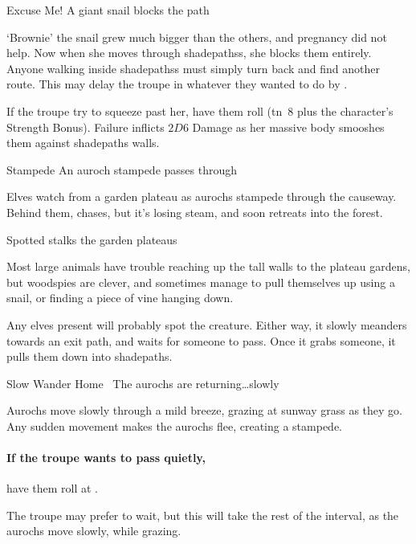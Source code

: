 
{Excuse Me!}%
{A giant snail blocks the path}%

`Brownie' the snail grew much bigger than the others, and pregnancy did not help.
Now when she moves through \glspl{shadepaths}, she blocks them entirely.
Anyone walking inside \glspl{shadepaths} must simply turn back and find another route.
This may delay the troupe in whatever they wanted to do by .

If the troupe try to squeeze past her, have them roll  (\gls{tn}~8 plus the character's Strength Bonus).
Failure inflicts $2D6$ Damage as her massive body smooshes them against \gls{shadepaths} walls.

{Stampede}%
{An auroch stampede passes through}%

Elves watch from a garden plateau as aurochs stampede through the causeway.
Behind them,  chases, but it's losing steam, and soon retreats into the forest.

{ Spotted}%
{ stalks the garden plateaus}%

Most large animals have trouble reaching up the tall walls to the plateau gardens, but woodspies are clever, and sometimes manage to pull themselves up using a snail, or finding a piece of vine hanging down.

Any elves present will probably spot the creature.
Either way, it slowly meanders towards an exit path, and waits for someone to pass.
Once it grabs someone, it pulls them down into \gls{shadepaths}.

{Slow Wander Home}%
{~The aurochs are returning\ldots slowly}%

Aurochs move slowly through a mild breeze, grazing at \gls{sunway} grass as they go.
Any sudden movement makes the aurochs flee, creating a stampede.

\paragraph{If the troupe wants to pass quietly,}
have them roll  at \tn[8].

The troupe may prefer to wait, but this will take the rest of the \gls{interval}, as the aurochs move slowly, while grazing.

